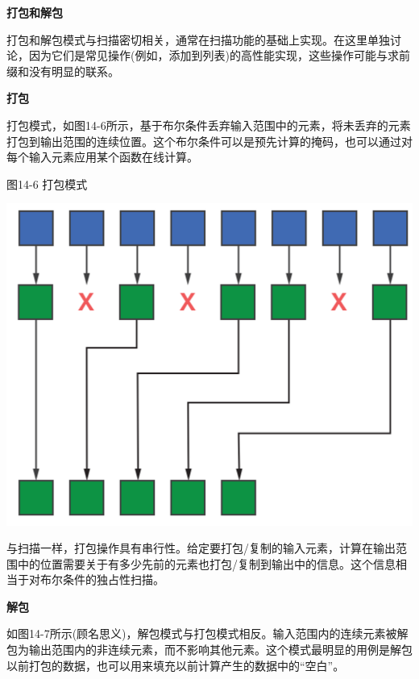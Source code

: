 \hspace*{\fill} \par %
\textbf{打包和解包}

打包和解包模式与扫描密切相关，通常在扫描功能的基础上实现。在这里单独讨论，因为它们是常见操作(例如，添加到列表)的高性能实现，这些操作可能与求前缀和没有明显的联系。\par

\hspace*{\fill} \par %
\textbf{打包}

打包模式，如图14-6所示，基于布尔条件丢弃输入范围中的元素，将未丢弃的元素打包到输出范围的连续位置。这个布尔条件可以是预先计算的掩码，也可以通过对每个输入元素应用某个函数在线计算。\par

\hspace*{\fill} \par %
图14-6 打包模式
\begin{center}
	\includegraphics[width=1.\textwidth]{content/chapter-14/images/6}
\end{center}

与扫描一样，打包操作具有串行性。给定要打包/复制的输入元素，计算在输出范围中的位置需要关于有多少先前的元素也打包/复制到输出中的信息。这个信息相当于对布尔条件的独占性扫描。\par

\hspace*{\fill} \par %
\textbf{解包}

如图14-7所示(顾名思义)，解包模式与打包模式相反。输入范围内的连续元素被解包为输出范围内的非连续元素，而不影响其他元素。这个模式最明显的用例是解包以前打包的数据，也可以用来填充以前计算产生的数据中的“空白”。\par


